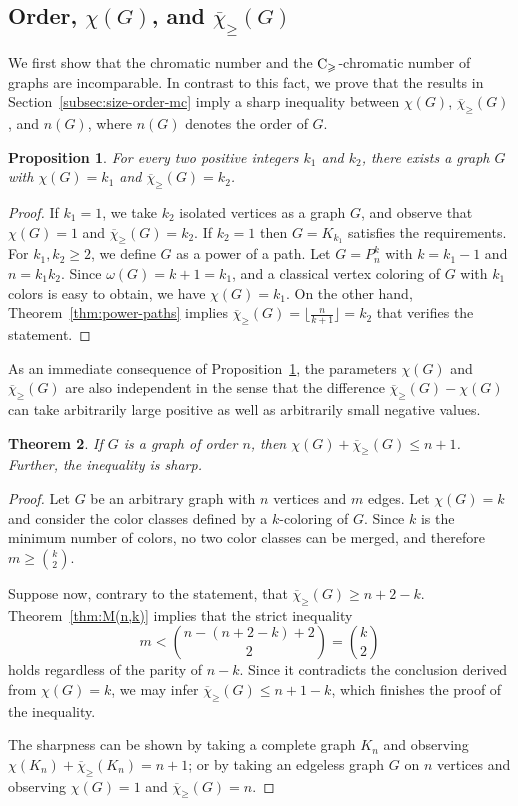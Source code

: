 \documentclass{article}
\newtheorem{theorem}{Theorem}
\newtheorem{proposition}[theorem]{Proposition}
\theoremstyle{definition}
\newcommand{\mc}{\overline{\chi}_{\geqslant}}
\newcommand{\cg}{{\rm C}_{\geqslant}}
\begin{document}
\subsection{Order, $\chi(G)$, and $\mc(G)$}
   We first show that the chromatic number and the $\cg$-chromatic number of graphs are incomparable. In contrast to this fact, we prove that the results in Section~\ref{subsec:size-order-mc} imply a sharp inequality between $\chi(G)$, $\mc(G)$, and $n(G)$, where $n(G)$ denotes the order of $G$. 
   \begin{proposition} \label{prop:chi-mc}
       For every two positive integers $k_1$ and $k_2$, there exists a graph $G$ with $\chi(G)=k_1$ and $\mc(G)=k_2$.
   \end{proposition}
   \begin{proof}
       If $k_1=1$, we take $k_2$ isolated vertices as a graph $G$, and observe that $\chi(G)=1$ and $\mc(G)=k_2$. If $k_2=1$ then $G= K_{k_1}$ satisfies the requirements. For $k_1, k_2 \ge 2$, we define $G$ as a power of a path. Let $G= P_n^k$ with $k=k_1-1$ and $n=k_1k_2$. Since 
       $\omega(G)=k+1=k_1$, and a  classical vertex coloring of $G$ with $k_1$ colors is easy to obtain, we have $\chi(G)=k_1$.  
       On the other hand, Theorem~\ref{thm:power-paths} implies $\mc(G)= \lfloor \frac{n}{k+1} \rfloor = k_2 $ that verifies the statement.
   \end{proof}

As an immediate consequence of Proposition~\ref{prop:chi-mc}, the parameters 
$\chi(G)$ and $\mc(G)$ are also independent in the sense that the difference $\mc(G)-\chi(G)$ can take arbitrarily large positive as well as arbitrarily small negative values.
   
   \begin{theorem} \label{thm:chi-mc-n}
       If $G$ is a graph of order $n$, then $\chi(G)+ \mc(G) \leq n+1$. Further, the inequality is sharp.
   \end{theorem}
   \begin{proof}
       Let $G$ be an arbitrary graph with $n$ vertices and $m$ edges. Let $\chi(G)=k$ and consider the color classes defined by a $k$-coloring of $G$. Since $k$ is the minimum number of colors, no two color classes can be merged, and therefore $m \ge {k \choose 2}$.

       Suppose now, contrary to the statement, that $\mc(G) \ge n+2-k$.  Theorem~\ref{thm:M(n,k)} implies that the strict inequality
       $$m < {n-(n+2-k)+2 \choose 2} ={k \choose 2}
       $$ 
 holds regardless of the parity of $n-k$. Since it contradicts the conclusion derived from $\chi(G)=k$, we may infer $\mc(G) \leq n +1 -k$, which finishes the proof of the inequality. 
       
       The sharpness can be shown by taking a complete graph $K_n$ and observing $\chi(K_n)+ \mc(K_n) = n+1$; or by taking an edgeless graph $G$ on $n$ vertices and observing $\chi(G)=1$ and $\mc(G)=n$. 
   \end{proof}
       
\end{document}
